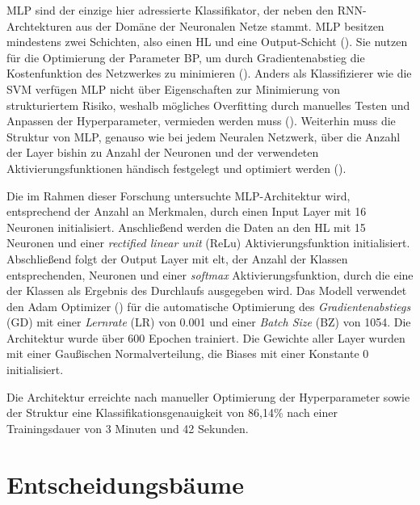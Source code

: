 MLP sind der einzige hier adressierte Klassifikator, der neben den RNN-Archtekturen aus der Domäne der Neuronalen Netze stammt. MLP besitzen mindestens zwei Schichten, also einen HL und eine Output-Schicht (\cite{jain1996artificial}). Sie nutzen für die Optimierung der Parameter BP, um durch Gradientenabstieg die Kostenfunktion des Netzwerkes zu minimieren (\cite{jain1996artificial}). Anders als Klassifizierer wie die SVM verfügen MLP nicht über Eigenschaften zur Minimierung von strukturiertem Risiko, weshalb mögliches Overfitting durch manuelles Testen und Anpassen der Hyperparameter, vermieden werden muss (\cite{Kaufmann2013}). Weiterhin muss die Struktur von MLP, genauso wie bei jedem Neuralen Netzwerk, über die Anzahl der Layer bishin zu Anzahl der Neuronen und der verwendeten Aktivierungsfunktionen händisch festgelegt und optimiert werden (\cite{haykin2007neural}).

Die im Rahmen dieser Forschung untersuchte MLP-Architektur wird, entsprechend der Anzahl an Merkmalen, durch einen Input Layer mit 16 Neuronen initialisiert. Anschließend werden die Daten an den HL mit 15 Neuronen und einer \textit{rectified linear unit} (ReLu) Aktivierungsfunktion initialisiert. Abschließend folgt der Output Layer mit elt, der Anzahl der Klassen entsprechenden, Neuronen und einer \textit{softmax} Aktivierungsfunktion, durch die eine der Klassen als Ergebnis des Durchlaufs ausgegeben wird. Das Modell verwendet den Adam Optimizer (\cite{kingma2014adam}) für die automatische Optimierung des \textit{Gradientenabstiegs} (GD) mit einer \textit{Lernrate} (LR) von 0.001 und einer \textit{Batch Size} (BZ) von 1054. Die Architektur wurde über 600 Epochen trainiert. Die Gewichte aller Layer wurden mit einer Gaußischen Normalverteilung, die Biases mit einer Konstante 0 initialisiert.

Die Architektur erreichte nach manueller Optimierung der Hyperparameter sowie der Struktur eine Klassifikationsgenauigkeit von 86,14\% nach einer Trainingsdauer von 3 Minuten und 42 Sekunden.

\section{Entscheidungsbäume}
\label{sec:decision-trees}

